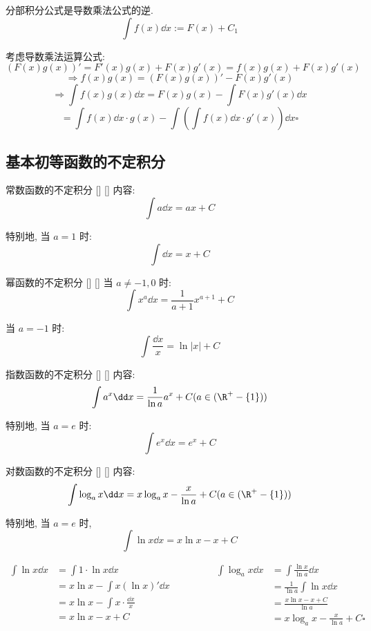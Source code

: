 \documentclass[UTF8]{ctexart}
\begin{document}
			\begin{prf}
				分部积分公式是导数乘法公式的逆. 
				\[\int f(x)\dd x:=F(x)+C_1\]
				
				考虑导数乘法运算公式: 
				\[(F(x)g(x))'=F'(x)g(x)+F(x)g'(x)=f(x)g(x)+F(x)g'(x)\]
				\[\Longrightarrow f(x)g(x)=(F(x)g(x))'-F(x)g'(x)\]
				\[\Longrightarrow\int f(x)g(x)\dd x=F(x)g(x)-\int F(x)g'(x)\dd x\]
				\[=\int f(x)\dd x\cdot g(x)-\int(\int f(x)\dd x \cdot g'(x))\dd x\square\]
			\end{prf}
		
		\subsection{基本初等函数的不定积分}
		
			\begin{xmp}
			    []
			    {常数函数的不定积分}
			    []
			    []
				内容: 
				\[\int a\dd x=ax+C\]
				
				特别地, 当 \(a=1\) 时: 
				\[\int\dd x=x+C\]
			\end{xmp}
			
			\begin{xmp}
			    []
			    {幂函数的不定积分}
			    []
			    []
				当 \(a\neq -1,0\) 时: 
				\[\int x^a\dd x=\frac{1}{a+1}x^{a+1}+C\]
				
				当 \(a=-1\) 时: 
				\[\int\frac{\dd x}{x}=\ln|x|+C\]
			\end{xmp}
			
			\begin{xmp}
			    []
			    {指数函数的不定积分}
			    []
			    []
				内容: 
				\[\int a^x\dd x=\frac{1}{\ln a}a^x+C(a\in(\R^+-\{1\}))\]
				
				特别地, 当 \(a=e\) 时: 
				\[\int e^x\dd x=e^x+C\]
			\end{xmp}
			
			\begin{xmp}
			    []
			    {对数函数的不定积分}
			    []
			    []
				内容: 
				\[\int\log_a x\dd x=x\log_a x-\frac{x}{\ln a}+C(a\in(\R^+-\{1\}))\]
				
				特别地, 当 \(a=e\) 时, 
				\[\int\ln x\dd x=x\ln x-x+C\]
			\end{xmp}
				
			\begin{prf}
				\[
				\begin{aligned}
					\int\ln x\dd x
					& = \int 1\cdot\ln x\dd x\\
					& = x\ln x-\int x(\ln x)'\dd x\\
					& = x\ln x-\int x\cdot\frac{\dd x}{x}\\
					& = x\ln x-x+C\\					
				\end{aligned}
				\qquad\qquad
				\begin{aligned}
					\int\log_a x\dd x
					& = \int\frac{\ln x}{\ln a}\dd x\\
					& = \frac{1}{\ln a}\int\ln x\dd x\\
					& = \frac{x\ln x-x+C}{\ln a}\\
					& = x\log_a x-\frac{x}{\ln a}+C\square
				\end{aligned}\]
			\end{prf}
			
\end{document}
